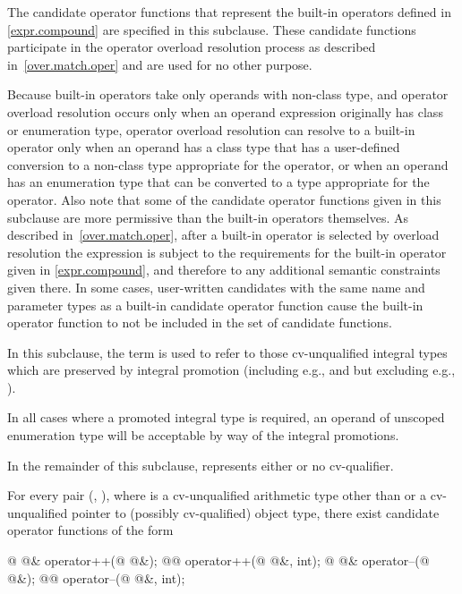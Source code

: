 \pnum
The candidate operator functions that represent the built-in operators
defined in \ref{expr.compound} are specified in this subclause.
These candidate
functions participate in the operator overload resolution process as
described in~\ref{over.match.oper} and are used for no other purpose.
\begin{note}
Because built-in operators take only operands with non-class type,
and operator overload resolution occurs only when an operand expression
originally has class or enumeration type,
operator overload resolution can resolve to a built-in operator only
when an operand has a class type that has a user-defined conversion to
a non-class type appropriate for the operator, or when an operand has
an enumeration type that can be converted to a type appropriate
for the operator.
Also note that some of the candidate operator functions given in this subclause are
more permissive than the built-in operators themselves.
As
described in~\ref{over.match.oper}, after a built-in operator is selected
by overload resolution the expression is subject to the requirements for
the built-in operator given in \ref{expr.compound}, and therefore to any
additional semantic constraints given there.
In some cases, user-written candidates
with the same name and parameter types as a built-in
candidate operator function cause the built-in operator function
to not be included in the set of candidate functions.
\end{note}

\pnum
{}%
%
In this subclause, the term
is used to refer to those cv-unqualified integral types which are preserved by
integral promotion (including e.g.,
and
but excluding e.g.,
).
\begin{note}
In all cases where a promoted integral type is
required, an operand of unscoped enumeration type will be acceptable by way of the
integral promotions.
\end{note}

\pnum
In the remainder of this subclause,  represents either
 or no cv-qualifier.

\pnum
For every pair
(,
),
where
is a cv-unqualified arithmetic type other than 
or a cv-unqualified pointer to (possibly cv-qualified) object type,
there exist candidate operator functions of the form
\begin{codeblock}
@ @& operator++(@ @&);
@@ operator++(@ @&, int);
@ @& operator--(@ @&);
@@ operator--(@ @&, int);
\end{codeblock}

